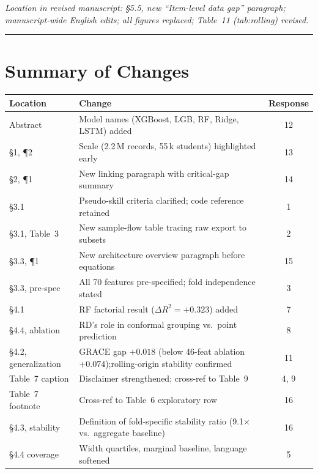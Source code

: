 \documentclass[11pt]{article}
\begin{document}
\textit{Location in revised manuscript: \S5.5, new ``Item-level data gap'' paragraph;
manuscript-wide English edits; all figures replaced; Table~11 (tab:rolling) revised.}

\bigskip
\hrule

\section*{Summary of Changes}

\begin{center}
\small
\begin{tabular}{@{}lp{9.5cm}c@{}}
\toprule
\textbf{Location} & \textbf{Change} & \textbf{Response} \\
\midrule
Abstract & Model names (XGBoost, LGB, RF, Ridge, LSTM) added & 12 \\
\S1, ¶2 & Scale (2.2\,M records, 55\,k students) highlighted early & 13 \\
\S2, ¶1 & New linking paragraph with critical-gap summary & 14 \\
\S3.1 & Pseudo-skill criteria clarified; code reference retained & 1 \\
\S3.1, Table~3 & New sample-flow table tracing raw export to subsets & 2 \\
\S3.3, ¶1 & New architecture overview paragraph before equations & 15 \\
\S3.3, pre-spec & All 70 features pre-specified; fold independence stated & 3 \\
\S4.1 & RF factorial result ($\Delta R^2 = +0.323$) added & 7 \\
\S4.4, ablation & RD's role in conformal grouping vs.\ point prediction & 8 \\
\S4.2, generalization & GRACE gap $+0.018$ (below 46-feat ablation $+0.074$);\newline rolling-origin stability confirmed & 11 \\
Table~7 caption & Disclaimer strengthened; cross-ref to Table~9 & 4, 9 \\
Table~7 footnote & Cross-ref to Table~6 exploratory row & 16 \\
\S4.3, stability & Definition of fold-specific stability ratio (9.1$\times$ vs.\ aggregate baseline) & 16 \\
\S4.4 coverage & Width quartiles, marginal baseline, language softened & 5 \\

\end{tabular}
\end{center}
\end{document}
